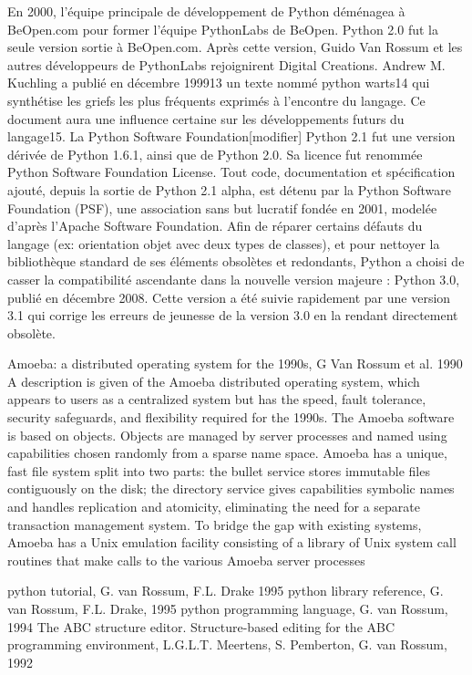 En 2000, l'équipe principale de développement de Python déménagea à BeOpen.com pour former l'équipe PythonLabs de BeOpen. Python 2.0 fut la seule version sortie à BeOpen.com. Après cette version, Guido Van Rossum et les autres développeurs de PythonLabs rejoignirent Digital Creations.
Andrew M. Kuchling a publié en décembre 199913 un texte nommé python warts14 qui synthétise les griefs les plus fréquents exprimés à l'encontre du langage. Ce document aura une influence certaine sur les développements futurs du langage15.
La Python Software Foundation[modifier]
Python 2.1 fut une version dérivée de Python 1.6.1, ainsi que de Python 2.0. Sa licence fut renommée Python Software Foundation License. Tout code, documentation et spécification ajouté, depuis la sortie de Python 2.1 alpha, est détenu par la Python Software Foundation (PSF), une association sans but lucratif fondée en 2001, modelée d'après l'Apache Software Foundation.
Afin de réparer certains défauts du langage (ex: orientation objet avec deux types de classes), et pour nettoyer la bibliothèque standard de ses éléments obsolètes et redondants, Python a choisi de casser la compatibilité ascendante dans la nouvelle version majeure : Python 3.0, publié en décembre 2008. Cette version a été suivie rapidement par une version 3.1 qui corrige les erreurs de jeunesse de la version 3.0 en la rendant directement obsolète.


Amoeba: a distributed operating system for the 1990s, 
G Van Rossum et al. 1990
A description is given of the Amoeba distributed operating system, which appears to users as a centralized system but has the speed, fault tolerance, security safeguards, and flexibility required for the 1990s. The Amoeba software is based on objects. Objects are managed by server processes and named using capabilities chosen randomly from a sparse name space. Amoeba has a unique, fast file system split into two parts: the bullet service stores immutable files contiguously on the disk; the directory service gives capabilities symbolic names and handles replication and atomicity, eliminating the need for a separate transaction management system. To bridge the gap with existing systems, Amoeba has a Unix emulation facility consisting of a library of Unix system call routines that make calls to the various Amoeba server processes

python tutorial, G. van Rossum, F.L. Drake 1995
python library reference, G. van Rossum, F.L. Drake, 1995
python programming language, G. van Rossum, 1994
The ABC structure editor. Structure-based editing for the ABC programming environment, L.G.L.T. Meertens, S. Pemberton, G. van Rossum, 1992

